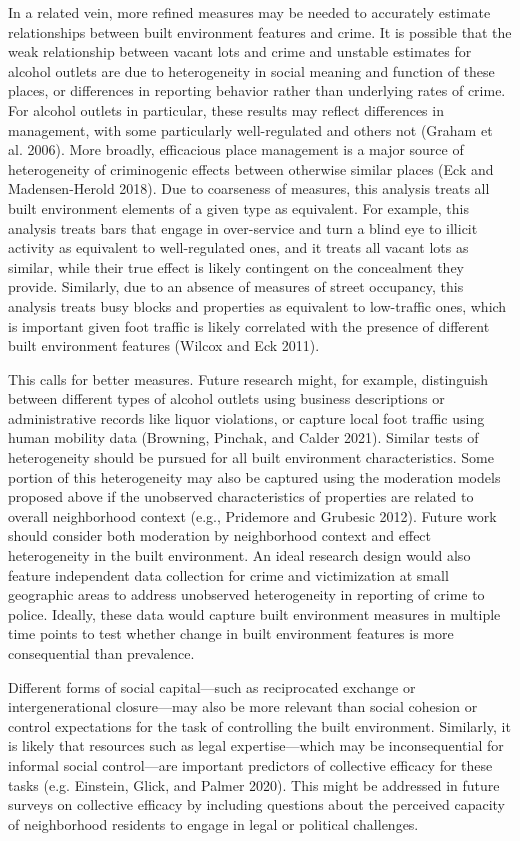 \documentclass [11pt, proquest] {uwthesis}[2015/03/03]
\begin{document}
In a related vein, more refined measures may be needed to accurately estimate relationships between built environment features and crime. It is possible that the weak relationship between vacant lots and crime and unstable estimates for alcohol outlets are due to heterogeneity in social meaning and function of these places, or differences in reporting behavior rather than underlying rates of crime. For alcohol outlets in particular, these results may reflect differences in management, with some particularly well-regulated and others not (Graham et al. 2006). More broadly, efficacious place management is a major source of heterogeneity of criminogenic effects between otherwise similar places (Eck and Madensen-Herold 2018). Due to coarseness of measures, this analysis treats all built environment elements of a given type as equivalent. For example, this analysis treats bars that engage in over-service and turn a blind eye to illicit activity as equivalent to well-regulated ones, and it treats all vacant lots as similar, while their true effect is likely contingent on the concealment they provide. Similarly, due to an absence of measures of street occupancy, this analysis treats busy blocks and properties as equivalent to low-traffic ones, which is important given foot traffic is likely correlated with the presence of different built environment features (Wilcox and Eck 2011).

This calls for better measures. Future research might, for example, distinguish between different types of alcohol outlets using business descriptions or administrative records like liquor violations, or capture local foot traffic using human mobility data (Browning, Pinchak, and Calder 2021). Similar tests of heterogeneity should be pursued for all built environment characteristics. Some portion of this heterogeneity may also be captured using the moderation models proposed above if the unobserved characteristics of properties are related to overall neighborhood context (e.g., Pridemore and Grubesic 2012). Future work should consider both moderation by neighborhood context and effect heterogeneity in the built environment. An ideal research design would also feature independent data collection for crime and victimization at small geographic areas to address unobserved heterogeneity in reporting of crime to police. Ideally, these data would capture built environment measures in multiple time points to test whether change in built environment features is more consequential than prevalence.

Different forms of social capital---such as reciprocated exchange or intergenerational closure---may also be more relevant than social cohesion or control expectations for the task of controlling the built environment. Similarly, it is likely that resources such as legal expertise---which may be inconsequential for informal social control---are important predictors of collective efficacy for these tasks (e.g. Einstein, Glick, and Palmer 2020). This might be addressed in future surveys on collective efficacy by including questions about the perceived capacity of neighborhood residents to engage in legal or political challenges.
\end{document}

